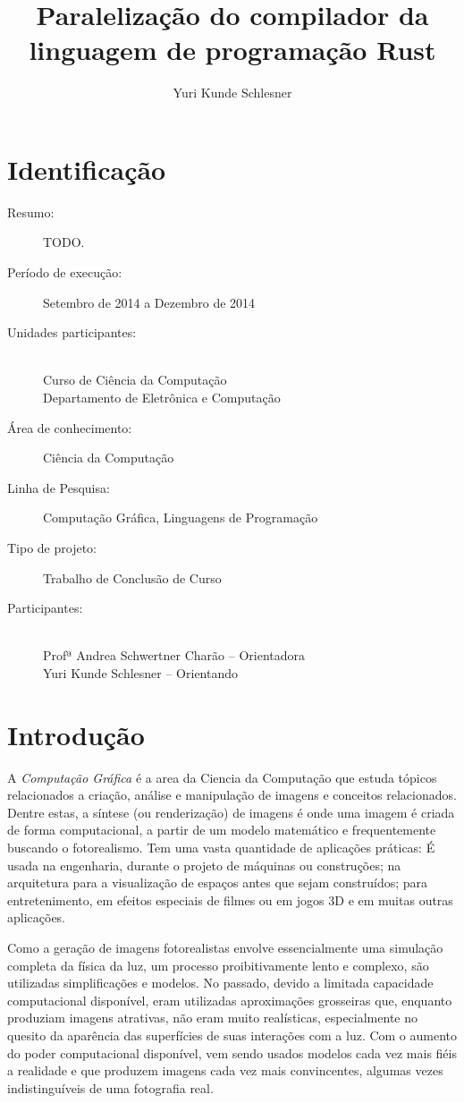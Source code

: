 \documentclass[12pt]{article}
\title{Paralelização do compilador da linguagem de programação Rust}
\author{Yuri Kunde Schlesner}
\newcommand{\todo}[1]{\textsf{\color{red}#1}}
\begin{document}
\maketitle

\section{Identificação}

\begin{description}
	\item[Resumo:] \todo{TODO.}
	\item[Período de execução:] Setembro de 2014 a Dezembro de 2014
	\item[Unidades participantes:] ~\\ Curso de Ciência da Computação \\ Departamento de Eletrônica e Computação
	\item[Área de conhecimento:] Ciência da Computação
	\item[Linha de Pesquisa:] Computação Gráfica, Linguagens de Programação
	\item[Tipo de projeto:] Trabalho de Conclusão de Curso
	\item[Participantes:] ~\\ Profª Andrea Schwertner Charão -- Orientadora \\ Yuri Kunde Schlesner -- Orientando
\end{description}

\section{Introdução}

A \emph{Computação Gráfica} é a area da Ciencia da Computação que estuda tópicos relacionados a
criação, análise e manipulação de imagens e conceitos relacionados. Dentre estas, a síntese (ou
renderização) de imagens é onde uma imagem é criada de forma computacional, a partir de um modelo
matemático e frequentemente buscando o fotorealismo. Tem uma vasta quantidade de aplicações
práticas: É usada na engenharia, durante o projeto de máquinas ou construções; na arquitetura para a
visualização de espaços antes que sejam construídos; para entretenimento, em efeitos especiais de
filmes ou em jogos 3D e em muitas outras aplicações.

Como a geração de imagens fotorealistas envolve essencialmente uma simulação completa da física da
luz, um processo proibitivamente lento e complexo, são utilizadas simplificações e modelos. No
passado, devido a limitada capacidade computacional disponível, eram utilizadas aproximações
grosseiras que, enquanto produziam imagens atrativas, não eram muito realísticas, especialmente no
quesito da aparência das superfícies de suas interações com a luz. Com o aumento do poder
computacional disponível, vem sendo usados modelos cada vez mais fiéis a realidade e que produzem
imagens cada vez mais convincentes, algumas vezes indistinguíveis de uma fotografia real.
\end{document}

